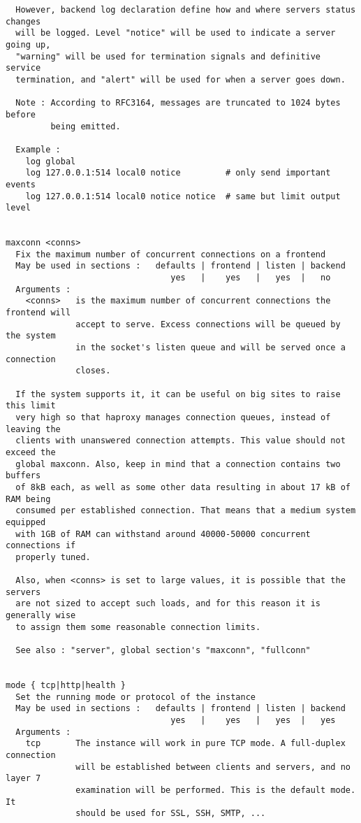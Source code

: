 \begin{verbatim}
  However, backend log declaration define how and where servers status changes
  will be logged. Level "notice" will be used to indicate a server going up,
  "warning" will be used for termination signals and definitive service
  termination, and "alert" will be used for when a server goes down.

  Note : According to RFC3164, messages are truncated to 1024 bytes before
         being emitted.

  Example :
    log global
    log 127.0.0.1:514 local0 notice         # only send important events
    log 127.0.0.1:514 local0 notice notice  # same but limit output level


maxconn <conns>
  Fix the maximum number of concurrent connections on a frontend
  May be used in sections :   defaults | frontend | listen | backend
                                 yes   |    yes   |   yes  |   no
  Arguments :
    <conns>   is the maximum number of concurrent connections the frontend will
              accept to serve. Excess connections will be queued by the system
              in the socket's listen queue and will be served once a connection
              closes.

  If the system supports it, it can be useful on big sites to raise this limit
  very high so that haproxy manages connection queues, instead of leaving the
  clients with unanswered connection attempts. This value should not exceed the
  global maxconn. Also, keep in mind that a connection contains two buffers
  of 8kB each, as well as some other data resulting in about 17 kB of RAM being
  consumed per established connection. That means that a medium system equipped
  with 1GB of RAM can withstand around 40000-50000 concurrent connections if
  properly tuned.

  Also, when <conns> is set to large values, it is possible that the servers
  are not sized to accept such loads, and for this reason it is generally wise
  to assign them some reasonable connection limits.

  See also : "server", global section's "maxconn", "fullconn"


mode { tcp|http|health }
  Set the running mode or protocol of the instance
  May be used in sections :   defaults | frontend | listen | backend
                                 yes   |    yes   |   yes  |   yes
  Arguments :
    tcp       The instance will work in pure TCP mode. A full-duplex connection
              will be established between clients and servers, and no layer 7
              examination will be performed. This is the default mode. It
              should be used for SSL, SSH, SMTP, ...


\end{verbatim}
